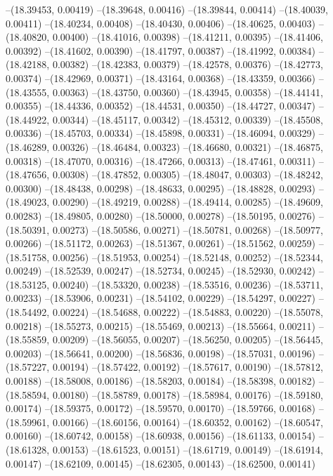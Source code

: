 --(18.39453, 0.00419)
--(18.39648, 0.00416)
--(18.39844, 0.00414)
--(18.40039, 0.00411)
--(18.40234, 0.00408)
--(18.40430, 0.00406)
--(18.40625, 0.00403)
--(18.40820, 0.00400)
--(18.41016, 0.00398)
--(18.41211, 0.00395)
--(18.41406, 0.00392)
--(18.41602, 0.00390)
--(18.41797, 0.00387)
--(18.41992, 0.00384)
--(18.42188, 0.00382)
--(18.42383, 0.00379)
--(18.42578, 0.00376)
--(18.42773, 0.00374)
--(18.42969, 0.00371)
--(18.43164, 0.00368)
--(18.43359, 0.00366)
--(18.43555, 0.00363)
--(18.43750, 0.00360)
--(18.43945, 0.00358)
--(18.44141, 0.00355)
--(18.44336, 0.00352)
--(18.44531, 0.00350)
--(18.44727, 0.00347)
--(18.44922, 0.00344)
--(18.45117, 0.00342)
--(18.45312, 0.00339)
--(18.45508, 0.00336)
--(18.45703, 0.00334)
--(18.45898, 0.00331)
--(18.46094, 0.00329)
--(18.46289, 0.00326)
--(18.46484, 0.00323)
--(18.46680, 0.00321)
--(18.46875, 0.00318)
--(18.47070, 0.00316)
--(18.47266, 0.00313)
--(18.47461, 0.00311)
--(18.47656, 0.00308)
--(18.47852, 0.00305)
--(18.48047, 0.00303)
--(18.48242, 0.00300)
--(18.48438, 0.00298)
--(18.48633, 0.00295)
--(18.48828, 0.00293)
--(18.49023, 0.00290)
--(18.49219, 0.00288)
--(18.49414, 0.00285)
--(18.49609, 0.00283)
--(18.49805, 0.00280)
--(18.50000, 0.00278)
--(18.50195, 0.00276)
--(18.50391, 0.00273)
--(18.50586, 0.00271)
--(18.50781, 0.00268)
--(18.50977, 0.00266)
--(18.51172, 0.00263)
--(18.51367, 0.00261)
--(18.51562, 0.00259)
--(18.51758, 0.00256)
--(18.51953, 0.00254)
--(18.52148, 0.00252)
--(18.52344, 0.00249)
--(18.52539, 0.00247)
--(18.52734, 0.00245)
--(18.52930, 0.00242)
--(18.53125, 0.00240)
--(18.53320, 0.00238)
--(18.53516, 0.00236)
--(18.53711, 0.00233)
--(18.53906, 0.00231)
--(18.54102, 0.00229)
--(18.54297, 0.00227)
--(18.54492, 0.00224)
--(18.54688, 0.00222)
--(18.54883, 0.00220)
--(18.55078, 0.00218)
--(18.55273, 0.00215)
--(18.55469, 0.00213)
--(18.55664, 0.00211)
--(18.55859, 0.00209)
--(18.56055, 0.00207)
--(18.56250, 0.00205)
--(18.56445, 0.00203)
--(18.56641, 0.00200)
--(18.56836, 0.00198)
--(18.57031, 0.00196)
--(18.57227, 0.00194)
--(18.57422, 0.00192)
--(18.57617, 0.00190)
--(18.57812, 0.00188)
--(18.58008, 0.00186)
--(18.58203, 0.00184)
--(18.58398, 0.00182)
--(18.58594, 0.00180)
--(18.58789, 0.00178)
--(18.58984, 0.00176)
--(18.59180, 0.00174)
--(18.59375, 0.00172)
--(18.59570, 0.00170)
--(18.59766, 0.00168)
--(18.59961, 0.00166)
--(18.60156, 0.00164)
--(18.60352, 0.00162)
--(18.60547, 0.00160)
--(18.60742, 0.00158)
--(18.60938, 0.00156)
--(18.61133, 0.00154)
--(18.61328, 0.00153)
--(18.61523, 0.00151)
--(18.61719, 0.00149)
--(18.61914, 0.00147)
--(18.62109, 0.00145)
--(18.62305, 0.00143)
--(18.62500, 0.00141)
